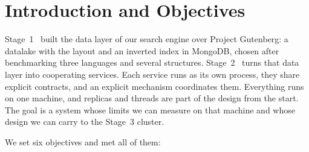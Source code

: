 \section{Introduction and Objectives}
\label{sec:introduction}

Stage~1~\cite{stage1} built the data layer of our search engine over Project Gutenberg: a datalake with the  layout
and an inverted index in MongoDB, chosen after benchmarking three languages and several structures. Stage~2~\cite{assignment} turns that
data layer into cooperating services. Each service runs as its own process, they share explicit contracts, and an
explicit mechanism coordinates them. Everything runs on one machine, and replicas and threads are part of the design
from the start. The goal is a system whose limits we can measure on that machine and whose design we can carry to the
Stage~3 cluster.

We set six objectives and met all of them:

